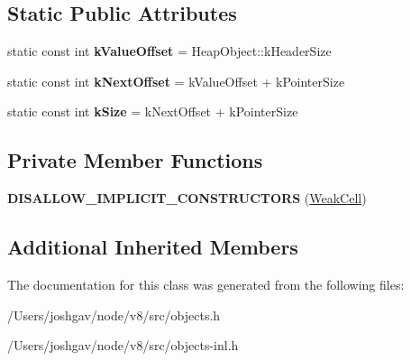 \subsection*{Static Public Attributes}
\begin{DoxyCompactItemize}
\item 
static const int {\bfseries k\+Value\+Offset} = Heap\+Object\+::k\+Header\+Size\hypertarget{classv8_1_1internal_1_1_weak_cell_a204a5ea4a689396c069e3b14b0bd95f4}{}\label{classv8_1_1internal_1_1_weak_cell_a204a5ea4a689396c069e3b14b0bd95f4}

\item 
static const int {\bfseries k\+Next\+Offset} = k\+Value\+Offset + k\+Pointer\+Size\hypertarget{classv8_1_1internal_1_1_weak_cell_a56c65cdfaa254633478903c8ad0c5857}{}\label{classv8_1_1internal_1_1_weak_cell_a56c65cdfaa254633478903c8ad0c5857}

\item 
static const int {\bfseries k\+Size} = k\+Next\+Offset + k\+Pointer\+Size\hypertarget{classv8_1_1internal_1_1_weak_cell_afc96435a046611973905a1d75ec1bbb5}{}\label{classv8_1_1internal_1_1_weak_cell_afc96435a046611973905a1d75ec1bbb5}

\end{DoxyCompactItemize}
\subsection*{Private Member Functions}
\begin{DoxyCompactItemize}
\item 
{\bfseries D\+I\+S\+A\+L\+L\+O\+W\+\_\+\+I\+M\+P\+L\+I\+C\+I\+T\+\_\+\+C\+O\+N\+S\+T\+R\+U\+C\+T\+O\+RS} (\hyperlink{classv8_1_1internal_1_1_weak_cell}{Weak\+Cell})\hypertarget{classv8_1_1internal_1_1_weak_cell_af07ba508d27583a7d46b68b84b80902f}{}\label{classv8_1_1internal_1_1_weak_cell_af07ba508d27583a7d46b68b84b80902f}

\end{DoxyCompactItemize}
\subsection*{Additional Inherited Members}


The documentation for this class was generated from the following files\+:\begin{DoxyCompactItemize}
\item 
/\+Users/joshgav/node/v8/src/objects.\+h\item 
/\+Users/joshgav/node/v8/src/objects-\/inl.\+h\end{DoxyCompactItemize}
